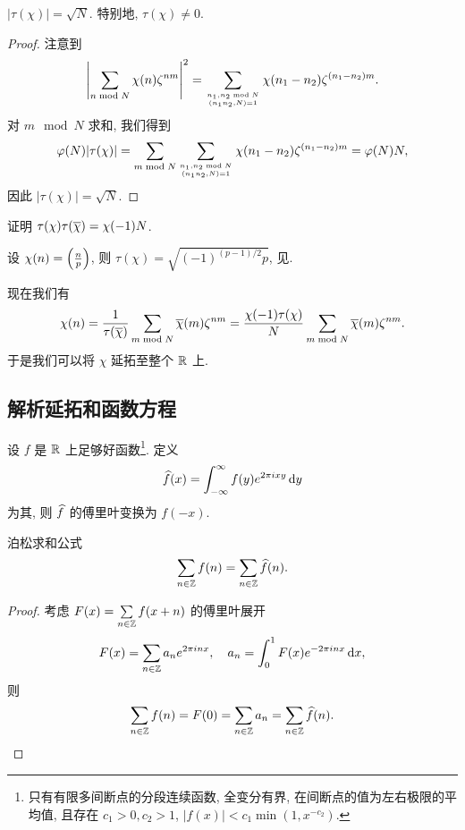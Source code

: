 \begin{lemma}{}{}
$|\tau(\chi)|=\sqrt{N}.$ 特别地, $\tau(\chi)\neq0$.
\end{lemma}
\begin{proof}
注意到
  \[\left|\sum_{n\mod N}\chi(n)\zeta^{nm}\right|^2=\sum_{n_1,n_2\mod N\atop(n_1n_2,N)=1}\chi(n_1-n_2)\zeta^{(n_1-n_2)m}.\]
对 $m\mod N$ 求和, 我们得到
  \[\varphi(N)|\tau(\chi)|=\sum_{m\mod N}\sum_{n_1,n_2\mod N\atop (n_1n_2,N)=1}\chi(n_1-n_2)\zeta^{(n_1-n_2)m}=\varphi(N)N,\]
因此 $|\tau(\chi)|=\sqrt N$.
\end{proof}

\begin{exercise}
证明 $\tau(\chi)\tau(\ov\chi)=\chi(-1)N$.
\end{exercise}

\begin{example}
设 $\chi(n)=\leg{n}{p}$, 则 $\tau(\chi)=\sqrt{(-1)^{(p-1)/2}p}$, 见\cite[Chapter IV, \S 3]{Lang1994}.
\end{example}


现在我们有
  \[\chi(n)=\frac1{\tau(\ov{\chi})}\sum_{m\mod N}\ov\chi(m)\zeta^{nm}
=\frac{\chi(-1)\tau(\chi)}N\sum_{m\mod N}\ov\chi(m)\zeta^{nm}.\]
于是我们可以将 $\chi$ 延拓至整个 $\BR$ 上.


\subsection{解析延拓和函数方程}
设 $f$ 是 $\BR$ 上足够好函数\footnote{只有有限多间断点的分段连续函数, 全变分有界, 在间断点的值为左右极限的平均值, 且存在 $c_1>0,c_2>1$, $|f(x)|<c_1\min (1,x^{-c_2})$.}.
定义
  \[\wh f(x)=\int_{-\infty}^\infty f(y)e^{2\pi ixy}\diff y\]
为其, 则 $\wh f$ 的傅里叶变换为 $f(-x)$. 

\begin{proposition}{泊松求和公式}{}
  \[\sum_{n\in\BZ} f(n)=\sum_{n\in\BZ} \wh f(n).\]
\end{proposition}
\begin{proof}
考虑 $F(x)=\suml_{n\in\BZ} f(x+n)$ 的傅里叶展开
  \[F(x)=\sum_{n\in\BZ} a_n e^{2\pi i nx},\quad a_n=\int_0^1 F(x)e^{-2\pi i nx}\diff x,\]
则
  \[\sum_{n\in\BZ} f(n)=F(0)=\sum_{n\in\BZ}a_n=\sum_{n\in\BZ}\wh f(n).\]
\end{proof}

